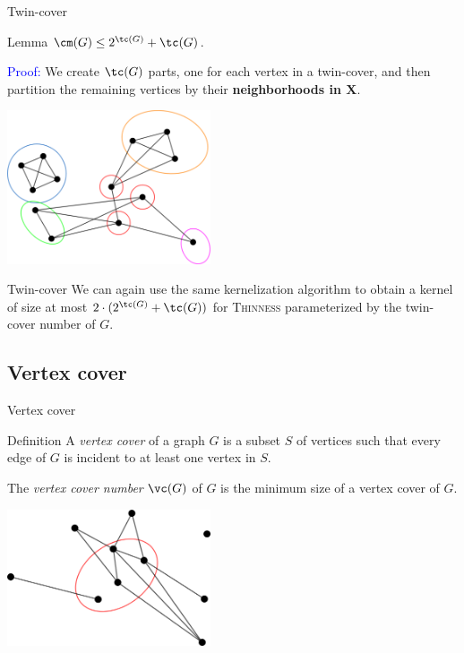 \documentclass{beamer}
\begin{document}
\begin{frame}{Twin-cover}
    \begin{block}{Lemma}
        $\cm(G) \leq 2^{\tc(G)} + \tc(G)$.
    \end{block}

    \textcolor{blue}{Proof:} We create $\tc(G)$ parts, one for each vertex in a twin-cover, and then partition the remaining vertices by their \textbf{neighborhoods in $\mathbf{X}$}.
    
    \begin{center}
        \includegraphics[width=0.45\textwidth]{img/twin-cover_cluster_module_partition.png}
    \end{center}
\end{frame}


\begin{frame}{Twin-cover}
    We can again use the same kernelization algorithm to obtain a kernel of size at most $2 \cdot (2^{\tc(G)} + \tc(G))$ for \textsc{Thinness} parameterized by the twin-cover number of $G$.
\end{frame}

\subsection{Vertex cover}
\begin{frame}{Vertex cover}
    \begin{block}{Definition}
        A \emph{vertex cover} of a graph $G$ is a subset $S$ of vertices such that every edge of $G$ is incident to at least one vertex in $S$.

        The \emph{vertex cover number} $\vc(G)$ of $G$ is the minimum size of a vertex cover of $G$.
    \end{block}
    
    \begin{center}
        \includegraphics[width=0.45\textwidth]{img/vertex_cover.png}
    \end{center}
\end{frame}
\end{document}
